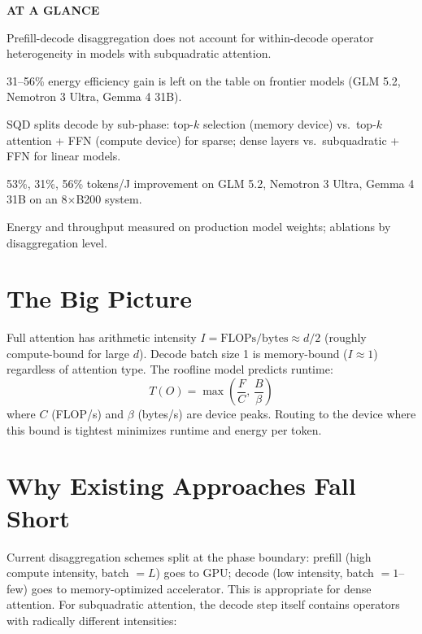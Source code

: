 \documentclass[10pt,twocolumn]{article}
\begin{document}
\begin{mdframed}[backgroundcolor=boxgray,linecolor=rulered,linewidth=1pt,
    innerleftmargin=6pt,innerrightmargin=6pt,
    innertopmargin=6pt,innerbottommargin=6pt]
\textbf{\small AT A GLANCE}\par\vspace{4pt}
\begin{description}[leftmargin=0pt,labelsep=4pt,itemsep=2pt,parsep=0pt,
    font=\small\bfseries]
  \item[Problem:] Prefill-decode disaggregation does not account for
    within-decode operator heterogeneity in models with subquadratic
    attention.
  \item[Why it matters:] 31--56\% energy efficiency gain is
    left on the table on frontier models (GLM 5.2, Nemotron 3 Ultra,
    Gemma 4 31B).
  \item[Method:] SQD splits decode by sub-phase: top-$k$ selection
    (memory device) vs.\ top-$k$ attention + FFN (compute device)
    for sparse; dense layers vs.\ subquadratic + FFN for linear models.
  \item[Result:] 53\%, 31\%, 56\% tokens/J improvement on GLM 5.2,
    Nemotron 3 Ultra, Gemma 4 31B on an 8$\times$B200 system.
  \item[Evidence:] Energy and throughput measured on production
    model weights; ablations by disaggregation level.
\end{description}
\end{mdframed}

\section{The Big Picture}

Full attention has arithmetic intensity $I = \text{FLOPs}/\text{bytes}
\approx d/2$ (roughly compute-bound for large $d$). Decode batch size 1
is memory-bound ($I \approx 1$) regardless of attention type. The
roofline model predicts runtime:
\[
  T(O) = \max\!\left(\frac{F}{C},\,\frac{B}{\beta}\right)
\]
where $C$ (FLOP/s) and $\beta$ (bytes/s) are device peaks. Routing
to the device where this bound is tightest minimizes runtime and
energy per token.

\section{Why Existing Approaches Fall Short}

Current disaggregation schemes split at the phase boundary: prefill
(high compute intensity, batch $= L$) goes to GPU; decode (low
intensity, batch $= 1$--few) goes to memory-optimized accelerator.
This is appropriate for dense attention. For subquadratic attention,
the decode step itself contains operators with radically different
intensities:
\end{document}

